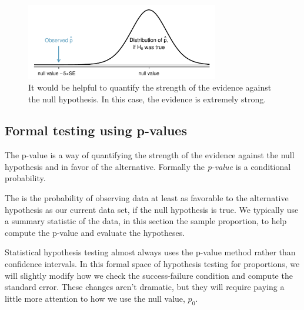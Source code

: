 \begin{figure}[hht]
\centering
\includegraphics[width=0.75\textwidth]{ch_inference_for_props/figures/whyWeWantPValue/whyWeWantPValueProp}
\caption{It would be helpful to quantify the strength of the evidence against the null hypothesis. In this case, the evidence is extremely strong.}
\label{whyWeWantPValue}
\end{figure}



\subsection{Formal testing using p-values}

\label{pValue}


The p-value is a way of quantifying the strength of the evidence against the null hypothesis and in favor of the alternative. Formally the \emph{p-value} is a conditional probability.

\begin{termBox}{
The  is the probability of observing data at least as favorable to the alternative hypothesis as our current data set, if the null hypothesis is true. We typically use a summary statistic of the data, in this section the sample proportion, to help compute the p-value and evaluate the hypotheses.}
\end{termBox}

Statistical hypothesis testing almost always uses the p-value method rather than confidence intervals. In this formal space of hypothesis testing for proportions, we will slightly modify how we check the success-failure condition and compute the standard error. These changes aren't dramatic, but they will require paying a little more attention to how we use the null value, $p_0$.


